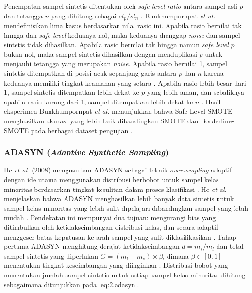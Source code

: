 Penempatan sampel sintetis ditentukan oleh \textit{safe level ratio} antara sampel asli $p$ dan tetangga $n$ yang dihitung sebagai $sl_p / sl_n$ \cite{Bunkhumpornpat2009SafeLevel}. Bunkhumpornpat \textit{et al.} mendefinisikan lima kasus berdasarkan nilai rasio ini. Apabila rasio bernilai tak hingga dan \textit{safe level} keduanya nol, maka keduanya dianggap \textit{noise} dan sampel sintetis tidak dihasilkan. Apabila rasio bernilai tak hingga namun \textit{safe level} $p$ bukan nol, maka sampel sintetis dihasilkan dengan menduplikasi $p$ untuk menjauhi tetangga yang merupakan \textit{noise}. Apabila rasio bernilai 1, sampel sintetis ditempatkan di posisi acak sepanjang garis antara $p$ dan $n$ karena keduanya memiliki tingkat keamanan yang setara \cite{Bunkhumpornpat2009SafeLevel}. Apabila rasio lebih besar dari 1, sampel sintetis ditempatkan lebih dekat ke $p$ yang lebih aman, dan sebaliknya apabila rasio kurang dari 1, sampel ditempatkan lebih dekat ke $n$ \cite{Bunkhumpornpat2009SafeLevel}. Hasil eksperimen Bunkhumpornpat \textit{et al.} menunjukkan bahwa Safe-Level SMOTE menghasilkan akurasi yang lebih baik dibandingkan SMOTE dan Borderline-SMOTE pada berbagai dataset pengujian \cite{Bunkhumpornpat2009SafeLevel}.

\subsubsection{ADASYN (\textit{Adaptive Synthetic Sampling})} \label{II.adasyn}
He \textit{et al.} (2008) mengusulkan ADASYN sebagai teknik \textit{oversampling} adaptif dengan ide utama menggunakan distribusi berbobot untuk sampel kelas minoritas berdasarkan tingkat kesulitan dalam proses klasifikasi \cite{He2008ADASYN}. He \textit{et al.} menjelaskan bahwa ADASYN menghasilkan lebih banyak data sintetis untuk sampel kelas minoritas yang lebih sulit dipelajari dibandingkan sampel yang lebih mudah \cite{He2008ADASYN}. Pendekatan ini mempunyai dua tujuan: mengurangi bias yang ditimbulkan oleh ketidakseimbangan distribusi kelas, dan secara adaptif menggeser batas keputusan ke arah sampel yang sulit diklasifikasikan \cite{He2008ADASYN}. Tahap pertama ADASYN menghitung derajat ketidakseimbangan $d = m_s / m_l$ dan total sampel sintetis yang diperlukan $G = (m_l - m_s) \times \beta$, dimana $\beta \in [0,1]$ menentukan tingkat keseimbangan yang diinginkan \cite{He2008ADASYN}. Distribusi bobot yang menentukan jumlah sampel sintetis untuk setiap sampel kelas minoritas dihitung sebagaimana ditunjukkan pada \ref{eq:2.adasyn}.


